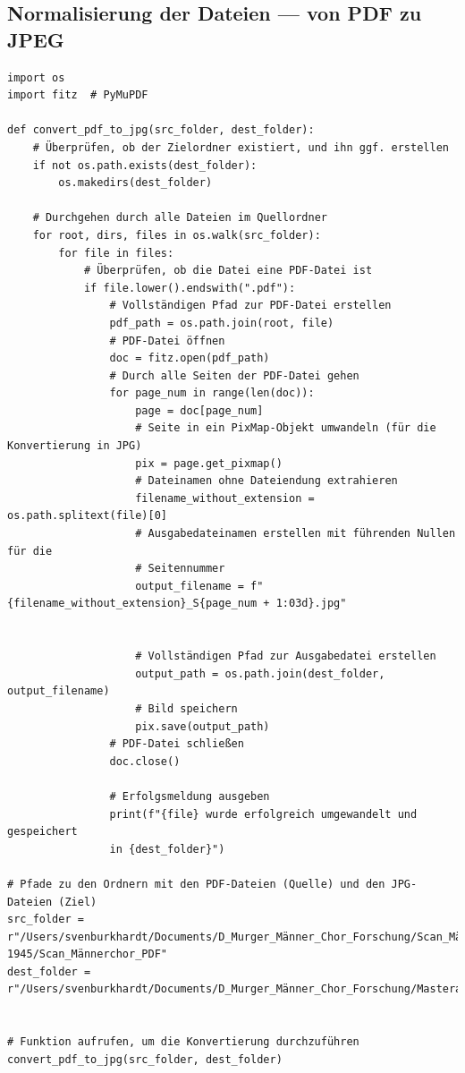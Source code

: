 \documentclass[12pt, a4paper, ngerman, bidi=default]{article}
\begin{document}
\subsection{Normalisierung der Dateien --- von PDF zu JPEG}
\begin{verbatim}
import os
import fitz  # PyMuPDF

def convert_pdf_to_jpg(src_folder, dest_folder):
    # Überprüfen, ob der Zielordner existiert, und ihn ggf. erstellen
    if not os.path.exists(dest_folder):
        os.makedirs(dest_folder)

    # Durchgehen durch alle Dateien im Quellordner
    for root, dirs, files in os.walk(src_folder):
        for file in files:
            # Überprüfen, ob die Datei eine PDF-Datei ist
            if file.lower().endswith(".pdf"):
                # Vollständigen Pfad zur PDF-Datei erstellen
                pdf_path = os.path.join(root, file)
                # PDF-Datei öffnen
                doc = fitz.open(pdf_path)
                # Durch alle Seiten der PDF-Datei gehen
                for page_num in range(len(doc)):
                    page = doc[page_num]
                    # Seite in ein PixMap-Objekt umwandeln (für die Konvertierung in JPG)
                    pix = page.get_pixmap()
                    # Dateinamen ohne Dateiendung extrahieren
                    filename_without_extension = os.path.splitext(file)[0]
                    # Ausgabedateinamen erstellen mit führenden Nullen für die 
                    # Seitennummer
                    output_filename = f"{filename_without_extension}_S{page_num + 1:03d}.jpg"


                    # Vollständigen Pfad zur Ausgabedatei erstellen
                    output_path = os.path.join(dest_folder, output_filename)
                    # Bild speichern
                    pix.save(output_path)
                # PDF-Datei schließen
                doc.close()
                
                # Erfolgsmeldung ausgeben
                print(f"{file} wurde erfolgreich umgewandelt und gespeichert
                in {dest_folder}")

# Pfade zu den Ordnern mit den PDF-Dateien (Quelle) und den JPG-Dateien (Ziel)
src_folder = r"/Users/svenburkhardt/Documents/D_Murger_Männer_Chor_Forschung/Scan_Männerchor/Männerchor_Akten_1925–1945/Scan_Männerchor_PDF"
dest_folder = r"/Users/svenburkhardt/Documents/D_Murger_Männer_Chor_Forschung/Masterarbeit/JPEG_Akten_Scans"


# Funktion aufrufen, um die Konvertierung durchzuführen
convert_pdf_to_jpg(src_folder, dest_folder)

\end{verbatim}
\end{document}
